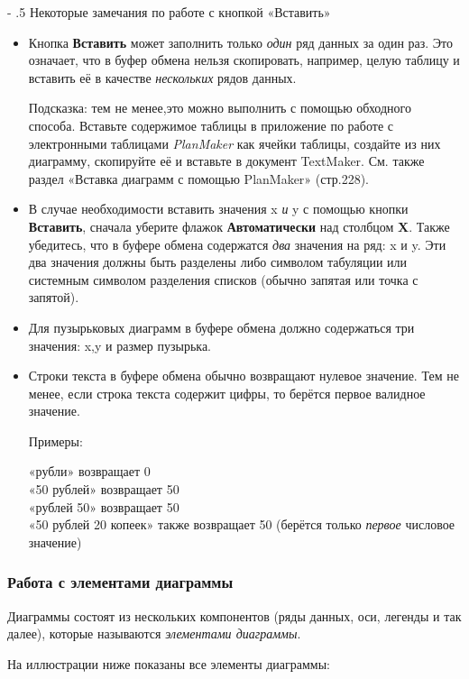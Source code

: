 ﻿\documentclass[a4paper,10pt]{article}
\makeatletter
\renewcommand\paragraph{%
   \@startsection{paragraph}{4}{0mm}%
      {-\baselineskip}%
      {.5\baselineskip}%
      {\normalfont\normalsize\bfseries}}
\makeatother
\begin{document}
\paragraph{Некоторые замечания по работе с кнопкой «Вставить»}
\begin{itemize}
 \item Кнопка \textbf{Вставить} может заполнить только \textit{один} ряд данных за один раз. Это означает, что в буфер обмена нельзя скопировать, например, целую таблицу и вставить её в качестве \textit{нескольких} рядов данных.
 
 Подсказка: тем не менее,это можно выполнить с помощью обходного способа. Вставьте содержимое таблицы в приложение по работе с электронными таблицами \textit{PlanMaker} как ячейки таблицы, создайте из них диаграмму, скопируйте её и вставьте в документ TextMaker. См. также раздел «Вставка диаграмм с помощью PlanMaker» (стр.228).
 \item В случае необходимости вставить значения x \textit{и} y с помощью кнопки \textbf{Вставить}, сначала уберите флажок \textbf{Автоматически} над столбцом \textbf{X}. Также убедитесь, что в буфере обмена содержатся \textit{два} значения на ряд: x и y. Эти два значения должны быть разделены либо символом табуляции или системным символом разделения списков (обычно запятая или точка с запятой).
 \item  Для пузырьковых диаграмм в буфере обмена должно содержаться три значения: x,y и размер пузырька.
 \item Строки текста в буфере обмена обычно возвращают нулевое значение. Тем не менее, если строка текста содержит цифры, то берётся первое валидное значение.
 
 Примеры:
 
 «рубли» возвращает 0\\
 «50 рублей» возвращает 50\\
 «рублей 50» возвращает 50\\
 «50 рублей 20 копеек» также возвращает 50 (берётся только \textit{первое} числовое значение)
\end{itemize}

\subsubsection{Работа с элементами диаграммы}
Диаграммы состоят из нескольких компонентов (ряды данных, оси, легенды и так далее), которые называются \textit{элементами диаграммы}.

На иллюстрации ниже показаны все элементы диаграммы:
\end{document}
